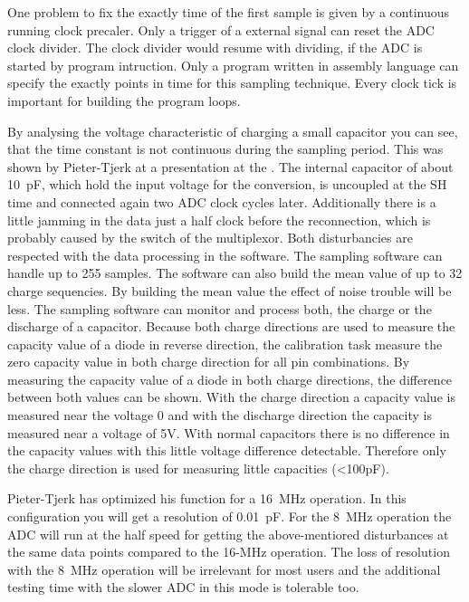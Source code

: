 One problem to fix the exactly time of the first sample is given by a continuous running clock precaler.
Only a trigger of a external signal can reset the ADC clock divider.
The clock divider would resume with dividing, if the ADC is started by program intruction.
Only a program written in assembly language can specify the exactly points in time for
this sampling technique. Every clock tick is important for building the program loops.

By analysing the voltage characteristic of charging a small capacitor you can see, that the time constant
is not continuous during the sampling period. This was shown by Pieter-Tjerk at a presentation at
the . The internal capacitor of about 10~pF, which hold the input voltage
for the conversion, is uncoupled at the SH time and connected again two ADC clock cycles later. 
Additionally there is a little jamming in the data just a half clock before the reconnection,
which is probably caused by the switch of the multiplexor.
Both disturbancies are respected with the data processing in the software.
The sampling software can handle up to 255 samples. The software can also build the mean value of
up to 32 charge sequencies. By building the mean value the effect of noise trouble will be less.
The sampling software can monitor and process both, the charge or the discharge of a capacitor.
Because both charge directions are used to measure the capacity value of a diode in reverse direction,
the calibration task measure the zero capacity value in both charge direction for all pin combinations.
By measuring the capacity value of a diode in both charge directions, the difference between both
values can be shown.
With the charge direction a capacity value is measured near the voltage 0 and with
the discharge direction the capacity is measured near a voltage of 5V.
With normal capacitors there is no difference in the capacity values with this little voltage difference detectable.
Therefore only the charge direction is used for measuring little capacities (\textless 100pF).

Pieter-Tjerk has optimized his function for a 16~MHz operation.
In this configuration you will get a resolution of 0.01~pF.
For the 8~MHz operation the ADC will run at the half speed for getting the above-mentiored disturbances
at the same data points compared to the 16-MHz operation.
The loss of resolution with the 8~MHz operation will be irrelevant for most users and the
additional testing time with the slower ADC in this mode is tolerable too.



